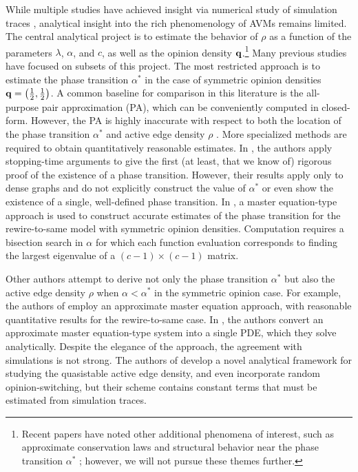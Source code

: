 \documentclass[review, onefignum, onetabnum]{siamart171218}
\newcommand{\pjm}[1]{{\color{blue}[PJM: #1]}}
\newcommand{\pc}[1]{{\color{comment_purple}[PC: #1]}}
\begin{document}
	While multiple studies have achieved insight via numerical study of simulation traces \cite{Yi2013, Shi2013, Ji2013},  analytical insight into the rich phenomenology of AVMs remains limited.
	The central analytical project is to estimate the behavior of $\rho$ as a function of the parameters $\lambda$, $\alpha$, and $c$, as well as the opinion density $\mathbf{q}$.\footnote{Recent papers have noted other additional phenomena of interest, such as approximate conservation laws \cite{Toruniewska2017} and structural behavior near the phase transition $\alpha^*$ \cite{Horstmeyer2018}; however, we will not pursue these themes further.}
	Many previous studies have focused on subsets of this project.
	The most restricted approach is to estimate the phase transition $\alpha^*$ in the case of symmetric opinion densities  $\mathbf{q} = \left(\frac{1}{2}, \frac{1}{2}\right)$.
	A common baseline for comparison in this literature is the all-purpose pair approximation (PA), which can be conveniently computed in closed-form. 
	However, the PA is highly inaccurate with respect to both the location of the phase transition $\alpha^*$ and active edge density $\rho$ \cite{Demirel2012, Durrett2012}. 
	More specialized methods are required to obtain quantitatively reasonable estimates. 
	In \cite{Basu2015a}, the authors apply stopping-time arguments to give the first (at least, that we know of) rigorous proof of the existence of a phase transition. 
	However, their results apply only to dense graphs and do not explicitly construct the value of $\alpha^*$ or even show the existence of a single, well-defined phase transition. 
	In \cite{Bohme2011}, a master equation-type approach is used to construct accurate estimates of the phase transition for the rewire-to-same model with symmetric opinion densities. 
	Computation requires a bisection search in $\alpha$ for which each function evaluation corresponds to finding the largest eigenvalue of a $(c-1) \times (c-1)$ matrix. %
	
	Other authors attempt to derive not only the phase transition $\alpha^*$ but also the active edge density $\rho$ when $\alpha < \alpha^*$ in the symmetric opinion case. 
	For example, the authors of \cite{Demirel2012} employ an approximate master equation approach, with reasonable quantitative results for the rewire-to-same case. 
	In \cite{Silk2014}, the authors convert an approximate master equation-type system into a single PDE, which they solve analytically. 
	Despite the elegance of the approach, the agreement with simulations is not strong. 
	The authors of \cite{Ji2013}  develop a novel analytical framework for studying the quasistable active edge density, and even incorporate random opinion-switching, but their scheme contains constant terms that must be estimated from simulation traces. 
		
\end{document}
